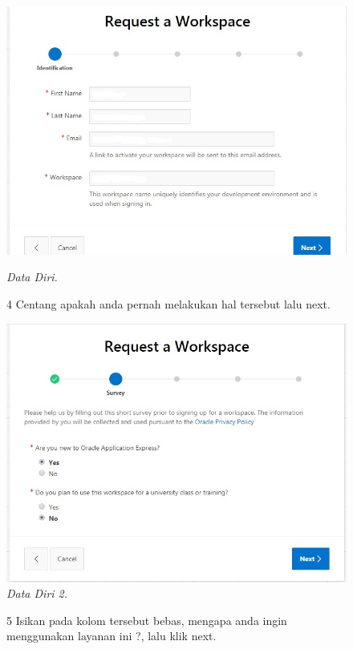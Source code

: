 \begin{enumerate}
\begin{figure}[!htbp]
    \begin{center}
\includegraphics[scale=0.4]{figures/req1.jpg}
    \caption{\textit{Data Diri.}}
        \end{center}
        
\item[4]Centang apakah anda pernah melakukan hal tersebut lalu next.  

    \begin{center}
\includegraphics[scale=0.4]{figures/req2.jpg}
    \caption{\textit{Data Diri 2.}}
        \end{center}
        \end{figure}

\begin{figure}
\item[5]Isikan pada kolom tersebut bebas, mengapa anda ingin menggunakan layanan ini ?, lalu klik next.


\end{figure}
\end{enumerate}
